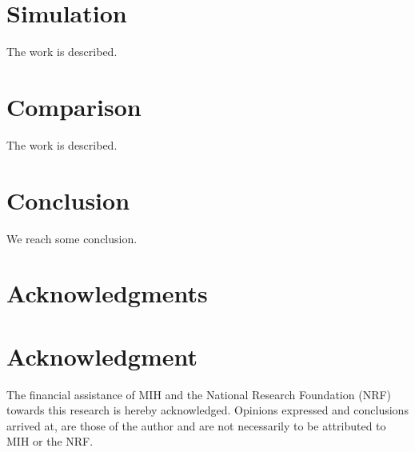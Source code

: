 \documentclass[10pt,a4paper,conference]{IEEEtran}
\begin{document}
\section{Simulation}
\label{simulation}

The work is described.


\section{Comparison}
\label{comparison}

The work is described.

\section{Conclusion}
\label{conclusion}

We reach some conclusion.

\ifCLASSOPTIONcompsoc
  \section*{Acknowledgments}
\else
  \section*{Acknowledgment}
\fi

The financial assistance of MIH and the National Research Foundation (NRF) towards this research is hereby acknowledged. Opinions expressed and
conclusions arrived at, are those of the author and are not necessarily to be attributed to MIH or the NRF.




\end{document}
